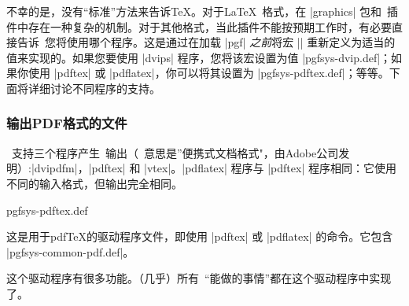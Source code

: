 不幸的是，没有``标准''方法来告诉\TeX 。对于\LaTeX\ 格式，在 |graphics| 包和\pgfname\ 插件中存在一种复杂的机制。对于其他格式，当此插件不能按预期工作时，有必要直接告诉\pgfname\ 您将使用哪个程序。这是通过在加载 |pgf| \emph{之前}将宏 |\pgfsysdriver| 重新定义为适当的值来实现的。如果您要使用 |dvips| 程序，您将该宏设置为值 |pgfsys-dvip.def|；如果你使用 |pdftex| 或 |pdflatex|，你可以将其设置为 |pgfsys-pdftex.def|；等等。下面将详细讨论不同程序的支持。


\subsubsection{输出PDF格式的文件}


\pgfname\ 支持三个程序产生\pdf\ 输出（\pdf\ 意思是''便携式文档格式"，由Adobe公司发明）:|dvipdfm|，|pdftex| 和 |vtex|。|pdflatex| 程序与 |pdftex| 程序相同：它使用不同的输入格式，但输出完全相同。

\begin{filedescription}{pgfsys-pdftex.def}

    这是用于pdf\TeX 的驱动程序文件，即使用 |pdftex| 或 |pdflatex| 的命令。它包含 |pgfsys-common-pdf.def|。


    这个驱动程序有很多功能。（几乎）所有\pgfname\ ``能做的事情''都在这个驱动程序中实现了。
\end{filedescription}


